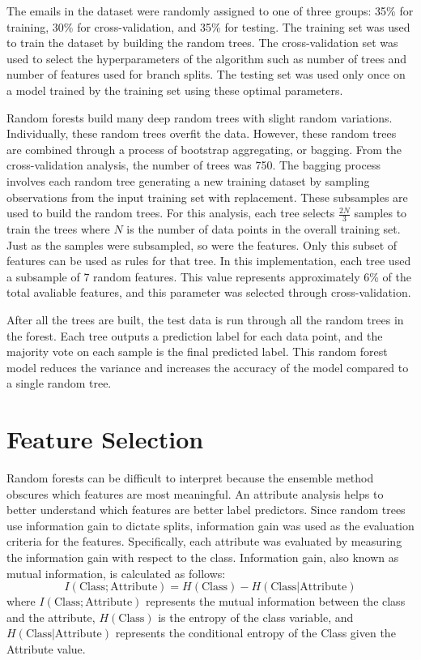 \documentclass[12pt]{report}
\begin{document}
The emails in the dataset were randomly assigned to one of three groups: 35\% for training, 30\% for cross-validation, and 35\% for testing.
The training set was used to train the dataset by building the random trees.
The cross-validation set was used to select the hyperparameters of the algorithm such as number of trees and number of features used for branch splits.
The testing set was used only once on a model trained by the training set using these optimal parameters.

Random forests build many deep random trees with slight random variations.
Individually, these random trees overfit the data.
However, these random trees are combined through a process of bootstrap aggregating, or bagging.
From the cross-validation analysis, the number of trees was 750.
The bagging process involves each random tree generating a new training dataset by sampling observations from the input training set with replacement.
These subsamples are used to build the random trees.
For this analysis, each tree selects $\frac{2N}{3}$ samples to train the trees where $N$ is the number of data points in the overall training set.
Just as the samples were subsampled, so were the features.
Only this subset of features can be used as rules for that tree.
In this implementation, each tree used a subsample of 7 random features.
This value represents approximately 6\% of the total avaliable features, and this parameter was selected through cross-validation.

After all the trees are built, the test data is run through all the random trees in the forest.
Each tree outputs a prediction label for each data point, and the majority vote on each sample is the final predicted label.
This random forest model reduces the variance and increases the accuracy of the model compared to a single random tree.

\section{Feature Selection}
Random forests can be difficult to interpret because the ensemble method obscures which features are most meaningful.
An attribute analysis helps to better understand which features are better label predictors.
Since random trees use information gain to dictate splits, information gain was used as the evaluation criteria for the features.
Specifically, each attribute was evaluated by measuring the information gain with respect to the class.
Information gain, also known as mutual information, is calculated as follows:
\begin{equation}
I(\text{Class}; \text{Attribute}) = H(\text{Class}) - H(\text{Class} | \text{Attribute})
\end{equation} \label{eq:info_gained}
where $I(\text{Class}; \text{Attribute})$ represents the mutual information between the class and the attribute, $H(\text{Class})$ is the entropy of the class variable, and  $H(\text{Class} | \text{Attribute})$ represents the conditional entropy of the Class given the Attribute value.  
\end{document}

